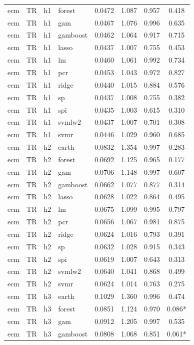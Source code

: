 \begin{ThreePartTable}
\begin{longtable}[t]{llclcccc}
ecm & TR & h1 & forest & 0.0472 & 1.087 & 0.957 & 0.418\\
ecm & TR & h1 & gam & 0.0467 & 1.076 & 0.996 & 0.635\\
ecm & TR & h1 & gamboost & 0.0462 & 1.064 & 0.917 & 0.715\\
ecm & TR & h1 & lasso & 0.0437 & 1.007 & 0.755 & 0.453\\
ecm & TR & h1 & lm & 0.0460 & 1.061 & 0.992 & 0.734\\
ecm & TR & h1 & pcr & 0.0453 & 1.043 & 0.972 & 0.827\\
ecm & TR & h1 & ridge & 0.0440 & 1.015 & 0.884 & 0.576\\
ecm & TR & h1 & sp & 0.0437 & 1.008 & 0.755 & 0.382\\
ecm & TR & h1 & spi & 0.0435 & 1.003 & 0.615 & 0.310\\
ecm & TR & h1 & svmlw2 & 0.0437 & 1.007 & 0.701 & 0.308\\
ecm & TR & h1 & svmr & 0.0446 & 1.029 & 0.960 & 0.685\\
\addlinespace
ecm & TR & h2 & earth & 0.0832 & 1.354 & 0.997 & 0.283\\
ecm & TR & h2 & forest & 0.0692 & 1.125 & 0.965 & 0.177\\
ecm & TR & h2 & gam & 0.0706 & 1.148 & 0.997 & 0.607\\
ecm & TR & h2 & gamboost & 0.0662 & 1.077 & 0.877 & 0.314\\
ecm & TR & h2 & lasso & 0.0628 & 1.022 & 0.864 & 0.495\\
ecm & TR & h2 & lm & 0.0675 & 1.099 & 0.995 & 0.797\\
ecm & TR & h2 & pcr & 0.0656 & 1.067 & 0.981 & 0.875\\
ecm & TR & h2 & ridge & 0.0624 & 1.016 & 0.793 & 0.391\\
ecm & TR & h2 & sp & 0.0632 & 1.028 & 0.915 & 0.343\\
ecm & TR & h2 & spi & 0.0619 & 1.007 & 0.643 & 0.313\\
ecm & TR & h2 & svmlw2 & 0.0640 & 1.041 & 0.868 & 0.499\\
ecm & TR & h2 & svmr & 0.0624 & 1.014 & 0.763 & 0.275\\
\addlinespace
ecm & TR & h3 & earth & 0.1029 & 1.360 & 0.996 & 0.474\\
ecm & TR & h3 & forest & 0.0851 & 1.124 & 0.970 & 0.086*\\
ecm & TR & h3 & gam & 0.0912 & 1.205 & 0.997 & 0.535\\
ecm & TR & h3 & gamboost & 0.0808 & 1.068 & 0.851 & 0.061*\\

\end{longtable}
\end{ThreePartTable}

